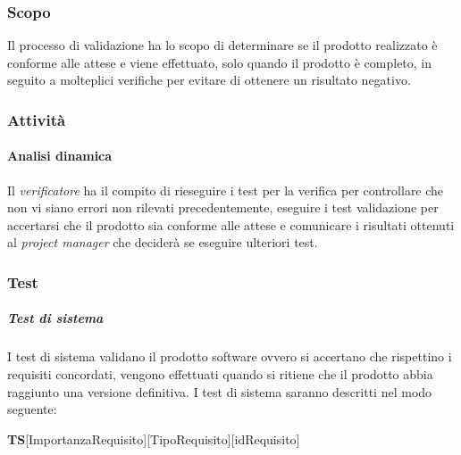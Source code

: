 \subsubsection{Scopo}
Il processo di validazione ha lo scopo di determinare se il prodotto realizzato è conforme alle attese e viene effettuato, solo quando il prodotto è completo, in seguito a molteplici verifiche per evitare di ottenere un risultato negativo.
\subsubsection{Attività}
\paragraph{Analisi dinamica} \Spazio
Il \textit{verificatore} ha il compito di rieseguire i test per la verifica per controllare che non vi siano errori non rilevati precedentemente, eseguire i test validazione per accertarsi che il prodotto sia conforme alle attese e comunicare i risultati ottenuti al \textit{project manager} che deciderà se eseguire ulteriori test.
\subsubsection{Test}
\subparagraph{Test di sistema} \Spazio
I test di sistema validano il prodotto software ovvero si accertano che rispettino i requisiti concordati, vengono effettuati quando si ritiene che il prodotto abbia raggiunto una versione definitiva.\newline
I test di sistema saranno descritti nel modo seguente: \Spazio
\centerline{\textbf{TS}[ImportanzaRequisito][TipoRequisito][idRequisito]}

